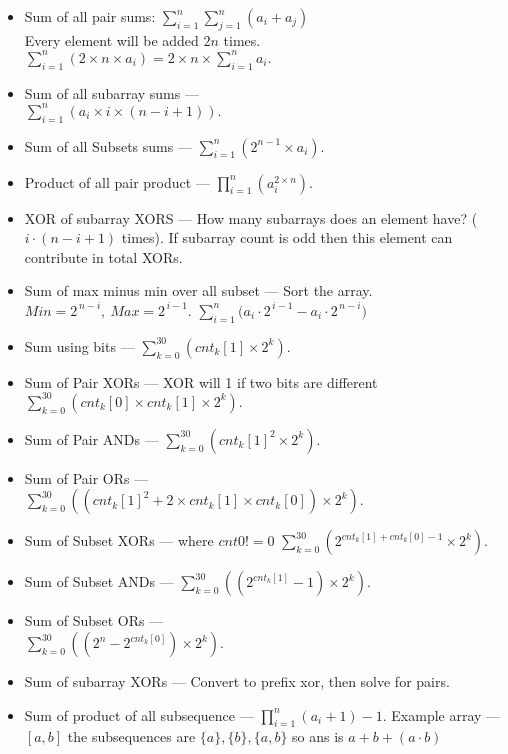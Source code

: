 \vspace{-4.5mm}
{\small
\begin{itemize}
\item Sum of all pair sums: $\sum_{i=1}^{n} \sum_{j=1}^{n} (a_i + a_j)$\\
Every element will be added $2n$ times.
$\sum_{i=1}^{n} (2 \times n \times a_{i}) = 2 \times n \times \sum_{i=1}^{n} a_{i}.$
\item Sum of all subarray sums — \\
$\sum_{i=1}^{n} \left(a_{i} \times i \times (n - i + 1)\right).$
\item Sum of all Subsets sums —
$\sum_{i=1}^{n} \left(2^{n-1} \times a_{i}\right).$
\item Product of all pair product —
$\prod_{i=1}^{n} \left(a_{i}^{2 \times n}\right).$
\item XOR of subarray XORS — How many subarrays does an element have? ($i \cdot (n - i + 1)$ times). If subarray count is odd then this element can contribute in total XORs.
\item Sum of max minus min over all subset — Sort the array. $Min = 2^{\,n-i}, \ Max = 2^{\,i-1}$. $\sum_{i=1}^{n} \big(a_i \cdot 2^{\,i-1} - a_i \cdot 2^{\,n-i}\big)$
\item Sum using bits —
$\sum_{k=0}^{30} \left(cnt_{k}[1] \times 2^{k}\right).$
\item Sum of Pair XORs — XOR will 1 if two bits
are different
$\sum_{k=0}^{30} \left(cnt_{k}[0] \times cnt_{k}[1] \times 2^{k}\right).$
\item Sum of Pair ANDs — 
$\sum_{k=0}^{30} \left(cnt_{k}[1]^2 \times 2^{k}\right).$
\item Sum of Pair ORs — \\
$\sum_{k=0}^{30} \left( \left( cnt_{k}[1]^{2} + 2 \times cnt_{k}[1] \times cnt_{k}[0] \right) \times 2^{k} \right).$
\item Sum of Subset XORs — where $cnt0 != 0$
$\sum_{k=0}^{30} \left(2^{cnt_{k}[1] + cnt_{k}[0] - 1} \times 2^{k}\right).$
\item Sum of Subset ANDs — 
$\sum_{k=0}^{30} \left( \left(2^{cnt_{k}[1]} - 1\right) \times 2^{k} \right).$
\item Sum of Subset ORs — \\
$\sum_{k=0}^{30} \left( \left(2^{n} - 2^{cnt_{k}[0]}\right) \times 2^{k} \right).$
\item Sum of subarray XORs — Convert to prefix xor, then solve for pairs.
\item Sum of product of all subsequence — $\prod_{i=1}^{n} (a_i+1)-1$.
Example array — $[a,b]$ the subsequences are $\{a\}, \{b\}, \{a,b\}$ so ans is $a + b + (a \cdot b)$
\end{itemize}
}
